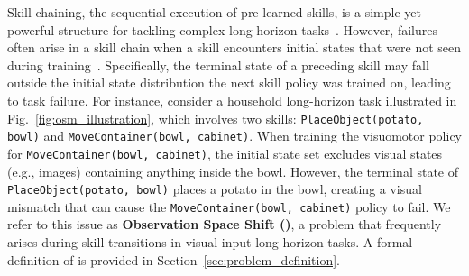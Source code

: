 Skill chaining, the sequential execution of pre-learned skills, is a simple yet powerful structure for tackling complex long-horizon tasks~\cite{bagaria2019option, konidaris2009skill}.
%
However, failures often arise in a skill chain when a skill encounters initial states that were not seen during training~\cite{lee2019composing, clegg2018learning}. 
%
Specifically, the terminal state of a preceding skill may fall outside the initial state distribution the next skill policy was trained on, leading to task failure. For instance, consider a household long-horizon task illustrated in Fig.~\ref{fig:osm_illustration}, which involves two skills: \texttt{PlaceObject(potato, bowl)} and \texttt{MoveContainer(bowl, cabinet)}.
When training the visuomotor policy for \texttt{MoveContainer(bowl, cabinet)}, the initial state set excludes visual states (e.g., images) containing anything inside the bowl.
However, the terminal state of \texttt{PlaceObject(potato, bowl)} places a potato in the bowl, creating a visual mismatch that can cause the \texttt{MoveContainer(bowl, cabinet)} policy to fail. We refer to this issue as \textbf{Observation Space Shift (\pb)}, a problem that frequently arises during skill transitions in visual-input long-horizon tasks. A formal definition of \pb is provided in Section~\ref{sec:problem_definition}.



